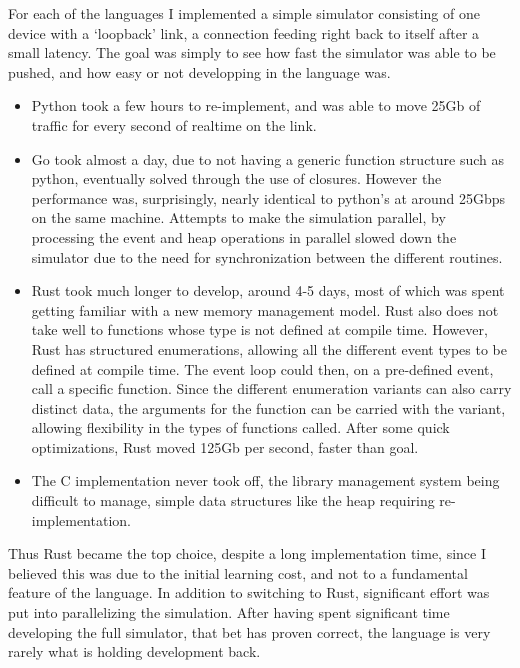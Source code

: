 For each of the languages I implemented a simple simulator consisting of one device with a `loopback' link, a connection feeding right back to itself after a small latency.
The goal was simply to see how fast the simulator was able to be pushed, and how easy or not developping in the language was.
\begin{itemize}
\item Python took a few hours to re-implement, and was able to move 25Gb of traffic for every second of realtime on the link.

\item Go took almost a day, due to not having a generic function structure such as python, eventually solved through the use of closures.
However the performance was, surprisingly, nearly identical to python's at around 25Gbps on the same machine.
Attempts to make the simulation parallel, by processing the event and heap operations in parallel slowed down the simulator due to the need for synchronization between the different routines.

\item Rust took much longer to develop, around 4-5 days, most of which was spent getting familiar with a new memory management model.
Rust also does not take well to functions whose type is not defined at compile time.
However, Rust has structured enumerations, allowing all the different event types to be defined at compile time. %
The event loop could then, on a pre-defined event, call a specific function.
Since the different enumeration variants can also carry distinct data, the arguments for the function can be carried with the variant, allowing flexibility in the types of functions called.
After some quick optimizations, Rust moved 125Gb per second, faster than goal.

\item The C implementation never took off, the library management system being difficult to manage, simple data structures like the heap requiring re-implementation.
\end{itemize}

Thus Rust became the top choice, despite a long implementation time, since I believed this was due to the initial learning cost, and not to a fundamental feature of the language.
In addition to switching to Rust, significant effort was put into parallelizing the simulation.
After having spent significant time developing the full simulator, that bet has proven correct, the language is very rarely what is holding development back.



